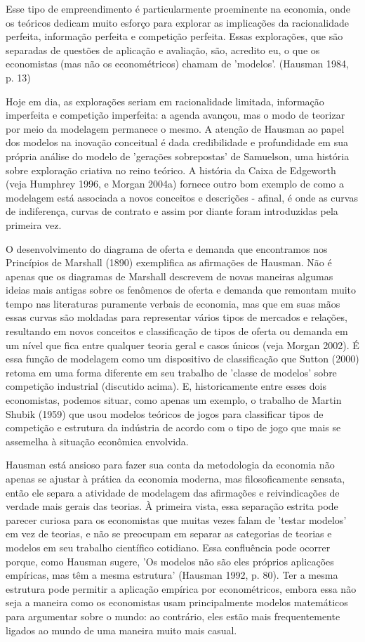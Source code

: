 \documentclass[a4paper,12pt]{article}[abntex2]
\begin{document}
Esse tipo de empreendimento é particularmente proeminente na economia, onde os teóricos dedicam muito esforço para explorar as implicações da racionalidade perfeita, informação perfeita e competição perfeita. Essas explorações, que são separadas de questões de aplicação e avaliação, são, acredito eu, o que os economistas (mas não os econométricos) chamam de 'modelos'. (Hausman 1984, p. 13)

Hoje em dia, as explorações seriam em racionalidade limitada, informação imperfeita e competição imperfeita: a agenda avançou, mas o modo de teorizar por meio da modelagem permanece o mesmo. A atenção de Hausman ao papel dos modelos na inovação conceitual é dada credibilidade e profundidade em sua própria análise do modelo de 'gerações sobrepostas' de Samuelson, uma história sobre exploração criativa no reino teórico. A história da Caixa de Edgeworth (veja Humphrey 1996, e Morgan 2004a) fornece outro bom exemplo de como a modelagem está associada a novos conceitos e descrições - afinal, é onde as curvas de indiferença, curvas de contrato e assim por diante foram introduzidas pela primeira vez.

O desenvolvimento do diagrama de oferta e demanda que encontramos nos Princípios de Marshall (1890) exemplifica as afirmações de Hausman. Não é apenas que os diagramas de Marshall descrevem de novas maneiras algumas ideias mais antigas sobre os fenômenos de oferta e demanda que remontam muito tempo nas literaturas puramente verbais de economia, mas que em suas mãos essas curvas são moldadas para representar vários tipos de mercados e relações, resultando em novos conceitos e classificação de tipos de oferta ou demanda em um nível que fica entre qualquer teoria geral e casos únicos (veja Morgan 2002). É essa função de modelagem como um dispositivo de classificação que Sutton (2000) retoma em uma forma diferente em seu trabalho de 'classe de modelos' sobre competição industrial (discutido acima). E, historicamente entre esses dois economistas, podemos situar, como apenas um exemplo, o trabalho de Martin Shubik (1959) que usou modelos teóricos de jogos para classificar tipos de competição e estrutura da indústria de acordo com o tipo de jogo que mais se assemelha à situação econômica envolvida.

Hausman está ansioso para fazer sua conta da metodologia da economia não apenas se ajustar à prática da economia moderna, mas filosoficamente sensata, então ele separa a atividade de modelagem das afirmações e reivindicações de verdade mais gerais das teorias. À primeira vista, essa separação estrita pode parecer curiosa para os economistas que muitas vezes falam de 'testar modelos' em vez de teorias, e não se preocupam em separar as categorias de teorias e modelos em seu trabalho científico cotidiano. Essa confluência pode ocorrer porque, como Hausman sugere, 'Os modelos não são eles próprios aplicações empíricas, mas têm a mesma estrutura' (Hausman 1992, p. 80). Ter a mesma estrutura pode permitir a aplicação empírica por econométricos, embora essa não seja a maneira como os economistas usam principalmente modelos matemáticos para argumentar sobre o mundo: ao contrário, eles estão mais frequentemente ligados ao mundo de uma maneira muito mais casual.
\end{document}
